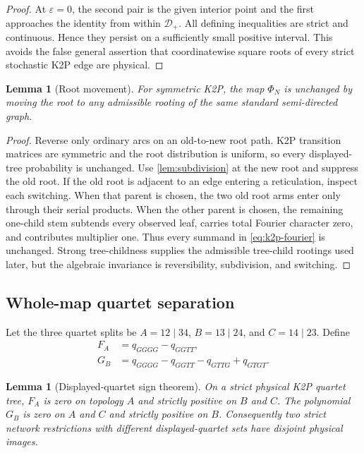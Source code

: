 \documentclass[11pt]{article}
\newtheorem{lemma}[theorem]{Lemma}
\theoremstyle{remark}
\newcommand{\Dplus}{\mathcal D_+}
\newcommand{\1}{\mathbf 1}
\begin{document}
\begin{proof}
At \(\varepsilon=0\), the second pair is the given interior point and the
first approaches the identity from within \(\Dplus\).  All defining
inequalities are strict and continuous.  Hence they persist on a sufficiently
small positive interval.  This avoids the false general assertion that
coordinatewise square roots of every strict stochastic K2P edge are physical.
\end{proof}

\begin{lemma}[Root movement]\label{lem:root-movement}
For symmetric K2P, the map \(\Phi_N\) is unchanged by moving the root to any
admissible rooting of the same standard semi-directed graph.
\end{lemma}

\begin{proof}
Reverse only ordinary arcs on an old-to-new root path.  K2P transition
matrices are symmetric and the root distribution is uniform, so every
displayed-tree probability is unchanged.  Use \cref{lem:subdivision} at the
new root and suppress the old root.  If the old root is adjacent to an edge
entering a reticulation, inspect each switching.  When that parent is chosen,
the two old root arms enter only through their serial products.  When the
other parent is chosen, the remaining one-child stem subtends every observed
leaf, carries total Fourier character zero, and contributes multiplier one.
Thus every summand in \eqref{eq:k2p-fourier} is unchanged.  Strong
tree-childness supplies the admissible tree-child rootings used later, but
the algebraic invariance is reversibility, subdivision, and switching.
\end{proof}

\subsection{Whole-map quartet separation}

Let the three quartet splits be
\(A=12\mid34\), \(B=13\mid24\), and \(C=14\mid23\).  Define
\begin{align}
 F_A&=q_{GGGG}-q_{GGTT},\label{eq:quartet-F}\\
 G_B&=q_{GGGG}-q_{GGTT}-q_{GTTG}+q_{GTGT}.
 \label{eq:quartet-G}
\end{align}

\begin{lemma}[Displayed-quartet sign theorem]\label{lem:quartet}
On a strict physical K2P quartet tree, \(F_A\) is zero on topology \(A\)
and strictly positive on \(B\) and \(C\).  The polynomial \(G_B\) is zero
on \(A\) and \(C\) and strictly positive on \(B\).  Consequently two strict
network restrictions with different displayed-quartet sets have disjoint
physical images.
\end{lemma}
\end{document}
